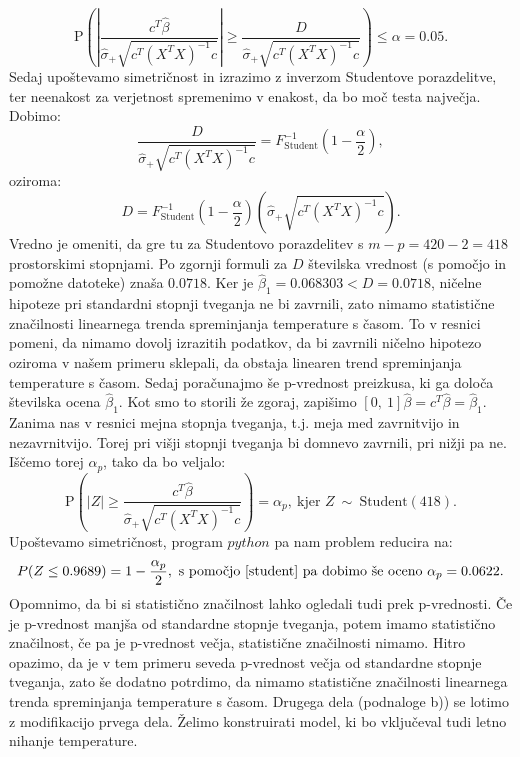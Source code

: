 \documentclass{article}
\begin{document}
$$
\text{P}\left(\left|\frac{c^T\hat{\beta}}{\hat{\sigma}_{+}\sqrt{c^T(X^TX)^{-1}c}}\right| \geq \frac{D}{\hat{\sigma}_{+}\sqrt{c^T(X^TX)^{-1}c}}\right)\leq \alpha = 0.05. 
$$
Sedaj upoštevamo simetričnost in izrazimo z inverzom Studentove porazdelitve, ter neenakost za verjetnost spremenimo v enakost, da bo moč testa največja. Dobimo:
$$
\frac{D}{\hat{\sigma}_{+}\sqrt{c^T(X^TX)^{-1}c}} = F^{-1}_{\text{Student}}\left(1 - \frac{\alpha}{2}\right),
$$
oziroma:
$$
D = F^{-1}_{\text{Student}}\left(1 - \frac{\alpha}{2}\right) \left(\hat{\sigma}_{+}\sqrt{c^T(X^TX)^{-1}c}\right).
$$
Vredno je omeniti, da gre tu za Studentovo porazdelitev s $m - p = 420 - 2 = 418$ prostorskimi stopnjami. 
Po zgornji formuli za $D$ številska vrednost (s pomočjo \cite{student} in pomožne datoteke) znaša $0.0718$.
\newline
Ker je $\hat{\beta}_1 = 0.068303 < D = 0.0718$, ničelne hipoteze pri standardni stopnji tveganja ne bi zavrnili, zato nimamo statistične značilnosti linearnega trenda spreminjanja temperature s časom. 
To v resnici pomeni, da nimamo dovolj izrazitih podatkov, da bi zavrnili ničelno hipotezo oziroma v našem primeru sklepali, da obstaja linearen trend spreminjanja temperature s časom.
\newline
\newline
Sedaj poračunajmo še p-vrednost preizkusa, ki ga določa številska ocena $\hat{\beta}_1$. 
Kot smo to storili že zgoraj, zapišimo $[0,~1]\hat{\beta} = c^T \hat{\beta} = \hat{\beta}_1$.
Zanima nas v resnici mejna stopnja tveganja, t.j. meja med zavrnitvijo in nezavrnitvijo. 
Torej pri višji stopnji tveganja bi domnevo zavrnili, pri nižji pa ne. 
Iščemo torej $\alpha_p$, tako da bo veljalo:
$$
\text{P}\left(|Z| \geq \frac{c^T\hat{\beta}}{\hat{\sigma}_{+}\sqrt{c^T(X^TX)^{-1}c}}\right) = \alpha_p,~\text{kjer }Z~\sim~\text{Student}(418). 
$$
Upoštevamo simetričnost, program $python$ pa nam problem reducira na: 
$$
P(Z \leq 0.9689) = 1 - \frac{\alpha_p}{2},~\text{s pomočjo \cite{student} pa dobimo še oceno $\alpha_p = 0.0622$.}
$$
Opomnimo, da bi si statistično značilnost lahko ogledali tudi prek p-vrednosti. Če je p-vrednost manjša od standardne stopnje tveganja, potem imamo statistično značilnost, če pa je p-vrednost večja, statistične značilnosti nimamo. 
Hitro opazimo, da je v tem primeru seveda p-vrednost večja od standardne stopnje tveganja, zato še dodatno potrdimo, da nimamo statistične značilnosti linearnega trenda spreminjanja temperature s časom.
\newline
\newline
Drugega dela (podnaloge b)) se lotimo z modifikacijo prvega dela. Želimo konstruirati model, ki bo vključeval tudi letno nihanje temperature. 
\end{document}
